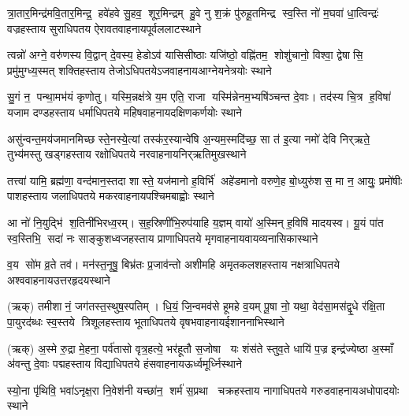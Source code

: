 %
{त्रा॒तार॒मिन्द्र॑मवि॒तार॒मिन्द्र॒ हवे॑हवे सु॒हव॒ शूर॒मिन्द्रम्}%
{हु॒वे नु श॒क्रं पु॑रुहू॒तमिन्द्र स्व॒स्ति नो॑ म॒घवा॑ धा॒त्विन्द्रः॑}%
{वज्रहस्ताय सुराधिपतय ऐरावतवाहनाय}{पूर्व}{ललाटस्थाने}

%
{त्वन्नो॑ अग्ने॒ वरु॑णस्य वि॒द्वान् दे॒वस्य॒ हेडोऽव॑ यासिसीष्ठाः}%
{यजि॑ष्ठो॒ वह्नि॑तम॒ शोशु॑चानो॒ विश्वा॒ द्वेषासि॒ प्रमु॑मुग्ध्य॒स्मत्}%
{शक्तिहस्ताय तेजोऽधिपतयेऽजवाहनाय}{आग्नेय}{नेत्रयोः स्थाने}

%
{सु॒गं न॒ पन्था॒मभ॑यं कृणोतु। यस्मि॒न्नक्ष॑त्रे य॒म एति॒ राजा}%
{यस्मि॑न्नेनम॒भ्यषि॑ञ्चन्त दे॒वाः। तद॑स्य चि॒त्र ह॒विषा॑ यजाम}%
{दण्डहस्ताय धर्माधिपतये महिषवाहनाय}{दक्षिण}{कर्णयोः स्थाने}

%
{असु॑न्वन्त॒मय॑जमानमिच्छ स्ते॒नस्ये॒त्यां तस्क॑र॒स्यान्वे॑षि}%
{अ॒न्यम॒स्मदि॑च्छ॒ सा त॑ इ॒त्या नमो॑ देवि निर्‌ऋते॒ तुभ्य॑मस्तु}%
{खड्गहस्ताय रक्षोधिपतये नरवाहनाय}{निर्‌ऋति}{मुखस्थाने}

%
{तत्त्वा॑ यामि॒ ब्रह्म॑णा॒ वन्द॑मान॒स्तदा शास्ते॒ यज॑मानो ह॒विर्भि॑}%
{अहे॑डमानो वरुणे॒ह बो॒ध्युरु॑शस॒ मा न॒ आयुः॒ प्रमो॑षीः}%
{पाशहस्ताय जलाधिपतये मकरवाहनाय}{पश्चिम}{बाह्वोः स्थाने}

%
{आ नो॑ नि॒युद्भि॑ श॒तिनी॑भिरध्व॒रम्। स॒ह॒स्रिणी॑भि॒रुप॑याहि य॒ज्ञम्}%
{वायो॑ अ॒स्मिन् ह॒विषि॑ मादयस्व। यू॒यं पा॑त स्व॒स्तिभि॒ सदा॑ नः}%
{साङ्कुशध्वजहस्ताय प्राणाधिपतये मृगवाहनाय}{वायव्य}{नासिकास्थाने}

%
{व॒य सो॑म व्र॒ते तव॑। मन॑स्त॒नूषु॒ बिभ्र॑तः}%
{प्र॒जाव॑न्तो अशीमहि}%
{अमृतकलशहस्ताय नक्षत्राधिपतये अश्ववाहनाय}{उत्तर}{हृदयस्थाने}

%
{(ऋक्) तमीशानं॒ जग॑तस्त॒स्थुष॒स्पतिम्। धि॒यं॒ जि॒न्वमव॑से हूमहे व॒यम्}%
{पू॒षा नो॒ यथा॒ वेद॑सा॒मस॑द्वृ॒धे र॑क्षि॒ता पा॒युरद॑ब्धः स्व॒स्तये}
{त्रिशूलहस्ताय भूताधिपतये वृषभवाहनाय}{ईशान}{नाभिस्थाने}

%
{(ऋक्) अ॒स्मे रु॒द्रा मे॒हना॒ पर्व॑तासो वृत्र॒हत्ये॒ भर॑हूतौ स॒जोषा }%
{यः शंस॑ते स्तुव॒ते धायि॑ प॒ज्र इन्द्र॑ज्येष्ठा अ॒स्माँ अ॑वन्तु दे॒वाः}%
{पद्महस्ताय विद्याधिपतये हंसवाहनाय}{ऊर्ध्व}{मूर्ध्निस्थाने}


%
{स्यो॒ना पृ॑थिवि॒ भवा॑ऽनृक्ष॒रा नि॒वेश॑नी}%
{यच्छा॑न॒ शर्म॑ स॒प्रथा}%
{चक्रहस्ताय नागाधिपतये गरुडवाहनाय}{अधो}{पादयोः स्थाने}

